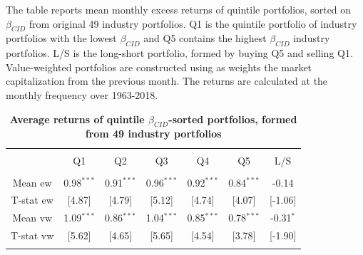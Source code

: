 \documentclass[12pt]{article}
\begin{document}
\begin{table}[!htbp] \centering 
  \caption{\textbf{Average returns of quintile $\beta_{CID}$-sorted portfolios, formed from 49 industry portfolios}} 
  \label{} 
  \begin{flushleft}
    {\medskip\small
 The table reports mean monthly excess returns of quintile portfolios, sorted on $\beta_{CID}$ from original 49 industry portfolios. Q1 is the quintile portfolio of industry portfolios with the lowest $\beta_{CID}$ and Q5 contains the highest $\beta_{CID}$ industry portfolios. L/S is the long-short portfolio, formed by buying Q5 and selling Q1. Value-weighted portfolios are constructed using as weights the market capitalization from the previous month. The returns are calculated at the monthly frequency over 1963-2018.}
    \medskip
    \end{flushleft}
\begin{tabular}{@{\extracolsep{5pt}} ccccccc} 
\\[-1.8ex]\hline 
\hline \\[-1.8ex] 
 & Q1 & Q2 & Q3 & Q4 & Q5 & L/S \\ 
\hline \\[-1.8ex] 
Mean ew & 0.98$^{***}$ & 0.91$^{***}$ & 0.96$^{***}$ & 0.92$^{***}$ & 0.84$^{***}$ & -0.14 \\ 
T-stat ew & [4.87] & [4.79] & [5.12] & [4.74] & [4.07] & [-1.06] \\ 
Mean vw & 1.09$^{***}$ & 0.86$^{***}$ & 1.04$^{***}$ & 0.85$^{***}$ & 0.78$^{***}$ & -0.31$^{*}$ \\ 
T-stat vw & [5.62] & [4.65] & [5.65] & [4.54] & [3.78] & [-1.90] \\ 
\hline \\[-1.8ex] 
\end{tabular} 
\end{table} 
\end{document}
